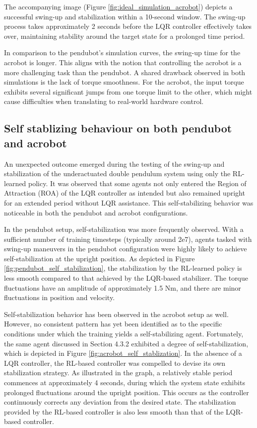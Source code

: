 The accompanying image (Figure \ref{fig:ideal_simulation_acrobot}) depicts a successful swing-up and stabilization within a 10-second window. The swing-up process takes approximately 2 seconds before the LQR controller effectively takes over, maintaining stability around the target state for a prolonged time period.

In comparison to the pendubot's simulation curves, the swing-up time for the acrobot is longer. This aligns with the notion that controlling the acrobot is a more challenging task than the pendubot. A shared drawback observed in both simulations is the lack of torque smoothness. For the acrobot, the input torque exhibits several significant jumps from one torque limit to the other, which might cause difficulties when translating to real-world hardware control.

\subsection{Self stablizing behaviour on both pendubot and acrobot}
An unexpected outcome emerged during the testing of the swing-up and stabilization of the underactuated double pendulum system using only the RL-learned policy. It was observed that some agents not only entered the Region of Attraction (ROA) of the LQR controller as intended but also remained upright for an extended period without LQR assistance. This self-stabilizing behavior was noticeable in both the pendubot and acrobot configurations.

In the pendubot setup, self-stabilization was more frequently observed. With a sufficient number of training timesteps (typically around 2e7), agents tasked with swing-up maneuvers in the pendubot configuration were highly likely to achieve self-stabilization at the upright position. As depicted in Figure \ref{fig:pendubot_self_stabilization}, the stabilization by the RL-learned policy is less smooth compared to that achieved by the LQR-based stabilizer. The torque fluctuations have an amplitude of approximately 1.5 Nm, and there are minor fluctuations in position and velocity.

Self-stabilization behavior has been observed in the acrobot setup as well. However, no consistent pattern has yet been identified as to the specific conditions under which the training yields a self-stabilizing agent. Fortunately, the same agent discussed in Section 4.3.2 exhibited a degree of self-stabilization, which is depicted in Figure \ref{fig:acrobot_self_stablization}. In the absence of a LQR controller, the RL-based controller was compelled to devise its own stabilization strategy. As illustrated in the graph, a relatively stable period commences at approximately 4 seconds, during which the system state exhibits prolonged fluctuations around the upright position. This occurs as the controller continuously corrects any deviation from the desired state. The stabilization provided by the RL-based controller is also less smooth than that of the LQR-based controller.

